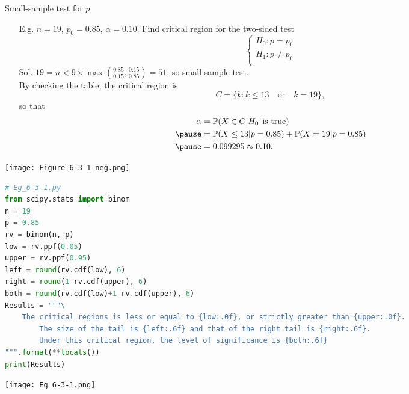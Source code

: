 \begin{frame}{Small-sample test for $p$}
\begin{enumerate}
 \item[E.g.] $n=19$, $p_0=0.85$, $\alpha=0.10$. Find critical region for the two-sided test
 \[
		 \begin{cases}
			H_0: p= p_0 \\
			H_1: p\ne p_0 \\
		 \end{cases}
 \]
 \vfill\pause
 Sol. $19 = n < 9 \times \max\left(\frac{0.85}{0.15},\frac{0.15}{0.85}\right) = 51$, so small sample test. \\[1em]\pause
 By checking the table, the critical region is
 \[
 C = \{k: k\le 13 \quad\text{or}\quad k=19\},
 \]
 so that
 \begin{align*}
	 \alpha &=\PP(X\in C | H_0 \:\: \text{is true}) \\ \pause
 &=\PP(X\le 13|p=0.85)+\PP(X= 19|p=0.85) \\ \pause
 &= 0.099295 \approx 0.10.
 \end{align*}
 \myEnd
\end{enumerate}
\end{frame}
\begin{frame}
 \begin{center}
  \texttt{[image: Figure-6-3-1-neg.png]}
 \end{center}
\end{frame}
\begin{frame}[fragile]
\begin{lstlisting}[language=Python]
# Eg_6-3-1.py
from scipy.stats import binom
n = 19
p = 0.85
rv = binom(n, p)
low = rv.ppf(0.05)
upper = rv.ppf(0.95)
left = round(rv.cdf(low), 6)
right = round(1-rv.cdf(upper), 6)
both = round(rv.cdf(low)+1-rv.cdf(upper), 6)
Results = """\
    The critical regions is less or equal to {low:.0f}, or strictly greater than {upper:.0f}.
		The size of the tail is {left:.6f} and that of the right tail is {right:.6f}.
		Under this critical region, the level of significance is {both:.6f}
""".format(**locals())
print(Results)
\end{lstlisting}
\begin{center}
\texttt{[image: Eg\_6-3-1.png]}
\end{center}
\end{frame}
